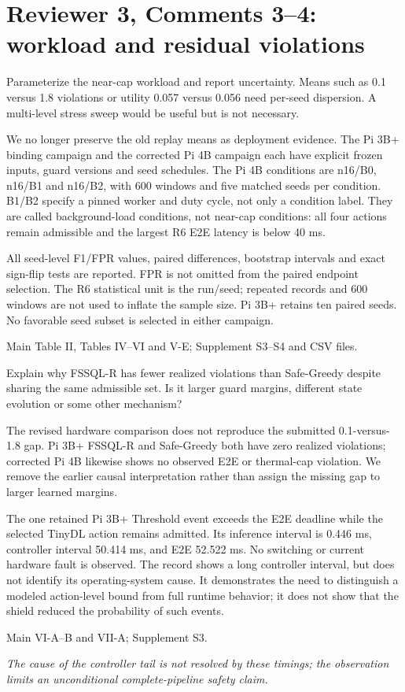 \documentclass[10pt,a4paper]{article}
\newcommand{\commentbox}[1]{\begin{rcommentbox}#1\end{rcommentbox}}
\newcommand{\responsebox}[1]{\begin{authorresponsebox}#1\end{authorresponsebox}}
\newcommand{\changebox}[1]{\begin{wherebox}#1\end{wherebox}}
\begin{document}
\clearpage
\section*{Reviewer 3, Comments 3--4: workload and residual violations}
\commentbox{Parameterize the near-cap workload and report uncertainty. Means such as 0.1 versus 1.8 violations or utility 0.057 versus 0.056 need per-seed dispersion. A multi-level stress sweep would be useful but is not necessary.}
\responsebox{We no longer preserve the old replay means as deployment evidence. The Pi 3B+ binding campaign and the corrected Pi 4B campaign each have explicit frozen inputs, guard versions and seed schedules. The Pi 4B conditions are n16/B0, n16/B1 and n16/B2, with 600 windows and five matched seeds per condition. B1/B2 specify a pinned worker and duty cycle, not only a condition label. They are called background-load conditions, not near-cap conditions: all four actions remain admissible and the largest R6 E2E latency is below 40 ms.

All seed-level F1/FPR values, paired differences, bootstrap intervals and exact sign-flip tests are reported. FPR is not omitted from the paired endpoint selection. The R6 statistical unit is the run/seed; repeated records and 600 windows are not used to inflate the sample size. Pi 3B+ retains ten paired seeds. No favorable seed subset is selected in either campaign.}
\changebox{Main Table II, Tables IV--VI and V-E; Supplement S3--S4 and CSV files.}
\commentbox{Explain why FSSQL-R has fewer realized violations than Safe-Greedy despite sharing the same admissible set. Is it larger guard margins, different state evolution or some other mechanism?}
\responsebox{The revised hardware comparison does not reproduce the submitted 0.1-versus-1.8 gap. Pi 3B+ FSSQL-R and Safe-Greedy both have zero realized violations; corrected Pi 4B likewise shows no observed E2E or thermal-cap violation. We remove the earlier causal interpretation rather than assign the missing gap to larger learned margins.

The one retained Pi 3B+ Threshold event exceeds the E2E deadline while the selected TinyDL action remains admitted. Its inference interval is 0.446 ms, controller interval 50.414 ms, and E2E 52.522 ms. No switching or current hardware fault is observed. The record shows a long controller interval, but does not identify its operating-system cause. It demonstrates the need to distinguish a modeled action-level bound from full runtime behavior; it does not show that the shield reduced the probability of such events.}
\changebox{Main VI-A--B and VII-A; Supplement S3.}
\begin{excerptbox}\emph{The cause of the controller tail is not resolved by these timings; the observation limits an unconditional complete-pipeline safety claim.}\end{excerptbox}
\end{document}
